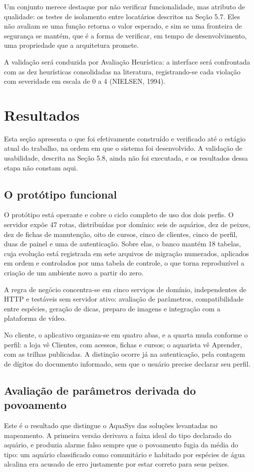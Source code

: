 \documentclass[12pt,oneside,a4paper,brazilian]{abntex2}
\begin{document}
Um conjunto merece destaque por não verificar funcionalidade, mas atributo de qualidade: os testes de isolamento entre locatários descritos na Seção 5.7. Eles não avaliam se uma função retorna o valor esperado, e sim se uma fronteira de segurança se mantém, que é a forma de verificar, em tempo de desenvolvimento, uma propriedade que a arquitetura promete.

A validação será conduzida por Avaliação Heurística: a interface será confrontada com as dez heurísticas consolidadas na literatura, registrando-se cada violação com severidade em escala de 0 a 4 (NIELSEN, 1994).


\section{Resultados}
Esta seção apresenta o que foi efetivamente construído e verificado até o estágio atual do trabalho, na ordem em que o sistema foi desenvolvido. A validação de usabilidade, descrita na Seção 5.8, ainda não foi executada, e os resultados dessa etapa não constam aqui.


\subsection{O protótipo funcional}
O protótipo está operante e cobre o ciclo completo de uso dos dois perfis. O servidor expõe 47 rotas, distribuídas por domínio: seis de aquários, dez de peixes, dez de fichas de manutenção, oito de cursos, cinco de clientes, cinco de perfil, duas de painel e uma de autenticação. Sobre elas, o banco mantém 18 tabelas, cuja evolução está registrada em sete arquivos de migração numerados, aplicados em ordem e controlados por uma tabela de controle, o que torna reproduzível a criação de um ambiente novo a partir do zero.

A regra de negócio concentra-se em cinco serviços de domínio, independentes de HTTP e testáveis sem servidor ativo: avaliação de parâmetros, compatibilidade entre espécies, geração de dicas, preparo de imagens e integração com a plataforma de vídeo.

No cliente, o aplicativo organiza-se em quatro abas, e a quarta muda conforme o perfil: a loja vê Clientes, com acessos, fichas e cursos; o aquarista vê Aprender, com as trilhas publicadas. A distinção ocorre já na autenticação, pela contagem de dígitos do documento informado, sem que o usuário precise declarar seu perfil.


\subsection{Avaliação de parâmetros derivada do povoamento}
Este é o resultado que distingue o AquaSys das soluções levantadas no mapeamento. A primeira versão derivava a faixa ideal do tipo declarado do aquário, e produzia alarme falso sempre que o povoamento fugia da média do tipo: um aquário classificado como comunitário e habitado por espécies de água alcalina era acusado de erro justamente por estar correto para seus peixes.
\end{document}
